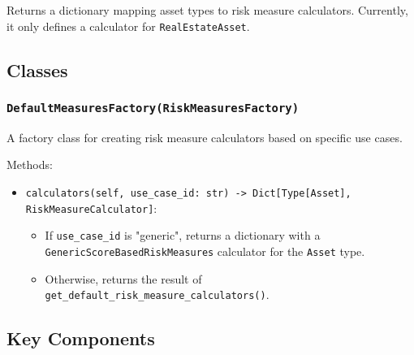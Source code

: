 \documentclass{article}
\begin{document}
Returns a dictionary mapping asset types to risk measure calculators. Currently, it only defines a calculator for \texttt{RealEstateAsset}.

\subsection{Classes}

\subsubsection{\texttt{DefaultMeasuresFactory(RiskMeasuresFactory)}}

A factory class for creating risk measure calculators based on specific use cases.

Methods:
\begin{itemize}
    \item \texttt{calculators(self, use\_case\_id: str) -> Dict[Type[Asset], RiskMeasureCalculator]}:
    \begin{itemize}
        \item If \texttt{use\_case\_id} is "generic", returns a dictionary with a \texttt{GenericScoreBasedRiskMeasures} calculator for the \texttt{Asset} type.
        \item Otherwise, returns the result of \texttt{get\_default\_risk\_measure\_calculators()}.
    \end{itemize}
\end{itemize}

\subsection{Key Components}
\end{document}
